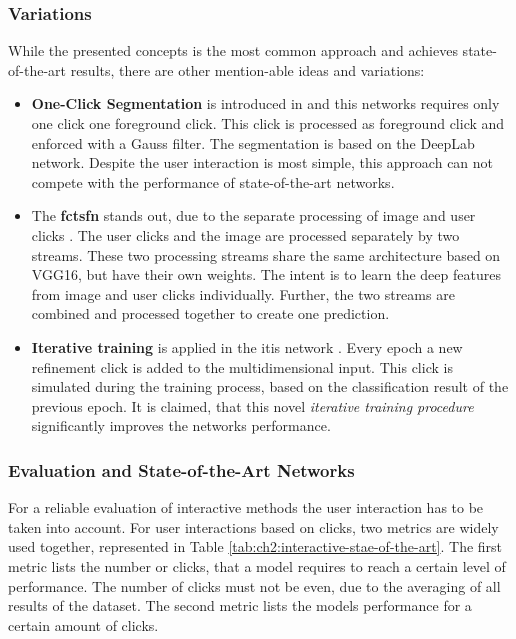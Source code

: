 \subsubsection{Variations}
While the presented concepts is the most common approach and achieves state-of-the-art results, there are other mention-able ideas and variations:
\begin{itemize}
	\item \textbf{One-Click Segmentation} is introduced in \cite{Maj20-One-Click} and this networks requires only one click one foreground click.
	This click is processed as foreground click and enforced with a Gauss filter.
	The segmentation is based on the DeepLab network.
	Despite the user interaction is most simple, this approach can not compete with the performance of state-of-the-art networks.
	
	\item The \textbf{\gls{fctsfn}} stands out, due to the separate processing of image and user clicks \cite{Hu19-TwoStreamFusionNetwork}.
	The user clicks and the image are processed separately by two streams.
	These two processing streams share the same architecture based on VGG16, but have their own weights.
	The intent is to learn the deep features from image and user clicks individually.
	Further, the two streams are combined and processed together to create one prediction.
	
	\item \textbf{Iterative training} is applied in the \gls{itis} network \cite{MVL18-ITIS}.
	Every epoch a new refinement click is added to the multidimensional input.
	This click is simulated during the training process, based on the classification result of the previous epoch.
	It is claimed, that this novel \textit{iterative training procedure} significantly improves the networks performance.
	
\end{itemize}


\subsubsection{Evaluation and State-of-the-Art Networks} \label{ch2:sec3:eval_interactive_methods}
For a reliable evaluation of interactive methods the user interaction has to be taken into account.
For user interactions based on clicks, two metrics are widely used together, represented in Table \ref{tab:ch2:interactive-stae-of-the-art}. 
The first metric lists the number or clicks, that a model requires to reach a certain level of performance. 
The number of clicks must not be even, due to the averaging of all results of the dataset.
The second metric lists the models performance for a certain amount of clicks.


